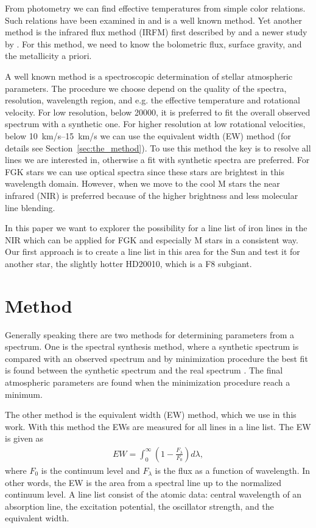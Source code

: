 \documentclass{aa}
\begin{document}
From photometry we can find effective temperatures from simple color
relations. Such relations have been examined in \cite{Ramirez2005a} and
is a well known method. Yet another method is the infrared flux method
(IRFM) first described by \cite{Blackwell1977} and a newer study by
\cite{Ramirez2005b,Casagrande2010}. For this method, we need to know the
bolometric flux, surface gravity, and the metallicity a priori.

A well known method is a spectroscopic determination of stellar
atmospheric parameters. The procedure we choose depend on the quality
of the spectra, resolution, wavelength region, and e.g. the effective
temperature and rotational velocity. For low resolution, below 20000, it
is preferred to fit the overall observed spectrum with a synthetic one.
For higher resolution at low rotational velocities, below
\SIrange{10}{15}{km/s} we can use the equivalent width (EW) method (for details
see Section~\ref{sec:the_method}). To use this method the key is to resolve
all lines we are interested in, otherwise a fit with synthetic spectra
are preferred. For FGK stars we can use optical spectra since these stars
are brightest in this wavelength domain. However, when we move to the cool
M stars the near infrared (NIR) is preferred because of the higher brightness
and less molecular line blending.

In this paper we want to explorer the possibility for a line list of
iron lines in the NIR which can be applied for FGK and especially M
stars in a consistent way. Our first approach is to create a line list
in this area for the Sun and test it for another star, the slightly
hotter HD20010, which is a F8 subgiant.



\section{Method}
\label{sec:method}

Generally speaking there are two methods for determining parameters from
a spectrum. One is the spectral synthesis method, where a synthetic
spectrum is compared with an observed spectrum and by minimization
procedure the best fit is found between the synthetic spectrum and the
real spectrum \citep[see e.g.][]{Onehag2012}. The final atmospheric
parameters are found when the minimization procedure reach a minimum.

The other method is the equivalent width (EW) method, which we use in this
work. With this method the EWs are measured for all lines in a line list. The
EW is given as
\begin{align}
    \label{eq:EW}
    EW = \int_0^\infty \left(1 - \frac{F_\lambda}{F_0}\right) d\lambda,
\end{align}
where $F_0$ is the continuum level and $F_\lambda$ is the flux as a
function of wavelength. In other words, the EW is the area from a
spectral line up to the normalized continuum level. A line list consist
of the atomic data: central wavelength of an absorption line, the
excitation potential, the oscillator strength, and the equivalent width.
\end{document}
